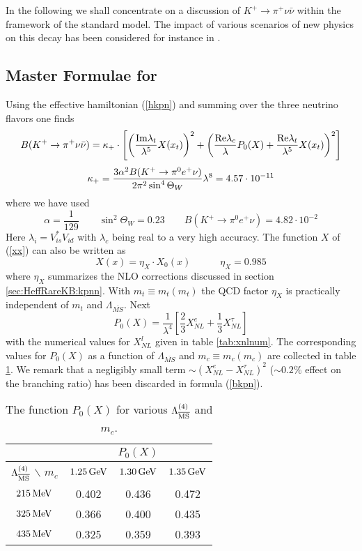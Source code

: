 In the following we shall concentrate on a discussion of $K^+ \to \pi^+
\nu\bar\nu$ within the framework of the standard model. The impact of
various scenarios of new physics on this decay has been considered for
instance in \cite{bigigabbiani:91}.

\subsection{Master Formulae for \kpnn}
\label{sec:Kpnn:MasterKp}
Using the effective hamiltonian (\ref{hkpn}) and summing over the three
neutrino flavors one finds
\begin{equation}\label{bkpn}
B(K^+ \to \pi^+\nu\bar\nu)=\kappa_+\cdot\left[\left({{\rm Im} \lambda_t\over\lambda^5}X(x_t)\right)^2+
\left({{\rm Re} \lambda_c\over\lambda}P_0(X)+{{\rm Re} \lambda_t\over\lambda^5}X(x_t)\right)^2
\right]
\end{equation}
\begin{equation}\label{kapp}
\kappa_+={3\alpha^2 B(K^+\to\pi^0e^+\nu)\over 2\pi^2\sin^4\Theta_W}
 \lambda^8=4.57\cdot 10^{-11}
\end{equation}
where we have used
\begin{equation}\label{alsinbr}
\alpha=\frac{1}{129}\qquad \sin^2\Theta_W=0.23 \qquad
B(K^+\to\pi^0e^+\nu)=4.82\cdot 10^{-2}
\end{equation}
Here $\lambda_i=V^\ast_{is}V_{id}$ with $\lambda_c$ being
real to a very high accuracy. The function $X$ of (\ref{xx})
can also be written as
\begin{equation}\label{xeta}
X(x)=\eta_X\cdot X_0(x) \qquad\quad \eta_X=0.985
\end{equation}
where $\eta_X$ summarizes the NLO corrections discussed in section
\ref{sec:HeffRareKB:kpnn}. With $m_t\equiv m_t(m_t)$ the QCD factor $\eta_X$
is practically independent of $m_t$ and $\Lambda_{\overline{MS}}$.
Next
\begin{equation}\label{p0k}
P_0(X)=\frac{1}{\lambda^4}\left[\frac{2}{3} X^e_{NL}+\frac{1}{3}
 X^\tau_{NL}\right]
\end{equation}
with the numerical values for $X_{NL}^l$ given in table \ref{tab:xnlnum}.
The corresponding values for $P_0(X)$ as a function of
$\Lambda_{\overline{MS}}$ and $m_c\equiv m_c(m_c)$ are collected in
table \ref{tab:P0Kplus}.
We remark that a negligibly small term $\sim(X_{NL}^e-X_{NL}^\tau)^2$
($\sim 0.2\%$ effect on the branching ratio)
has been discarded in formula (\ref{bkpn}).

\begin{table}[htb]
\caption[]{The function $P_0(X)$ for various $\Lambda_{\overline{\rm MS}}^{(4)}$ and $m_c$.
\label{tab:P0Kplus}}
\begin{center}
\begin{tabular}{|c|c|c|c|}
&\multicolumn{3}{c|}{$P_0(X)$}\\
\hline
$\Lambda_{\overline{\rm MS}}^{(4)}$ $\backslash$ $m_c$ & $1.25\, {\rm GeV}$ & $1.30\, {\rm GeV}$ & $1.35\, {\rm GeV}$  \\
\hline
$215\, {\rm MeV}$ & 0.402 & 0.436 & 0.472 \\
$325\, {\rm MeV}$ & 0.366 & 0.400 & 0.435 \\
$435\, {\rm MeV}$ & 0.325 & 0.359 & 0.393 
\end{tabular}
\end{center}
\end{table}


